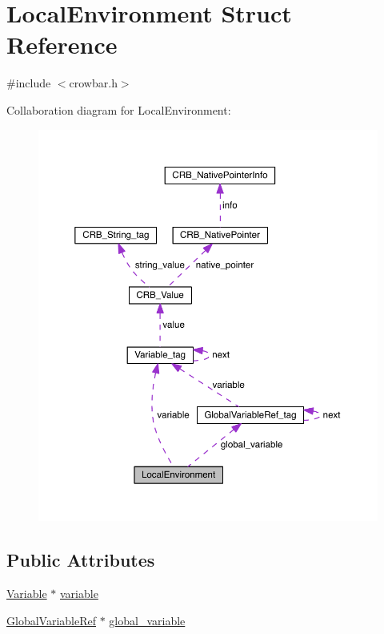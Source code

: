 \hypertarget{struct_local_environment}{}\section{Local\+Environment Struct Reference}
\label{struct_local_environment}


{\ttfamily \#include $<$crowbar.\+h$>$}



Collaboration diagram for Local\+Environment\+:\nopagebreak
\begin{figure}[H]
\begin{center}
\leavevmode
\includegraphics[width=350pt]{struct_local_environment__coll__graph}
\end{center}
\end{figure}
\subsection*{Public Attributes}
\begin{DoxyCompactItemize}
\item 
\hyperlink{crowbar_8h_a070c86ad7ae39536aed471927d04dee4}{Variable} $\ast$ \hyperlink{struct_local_environment_a80c4a3efddd4486c76844fb7f22bca1d}{variable}
\item 
\hyperlink{crowbar_8h_ac709ecd8d021425e844a82940d5d1028}{Global\+Variable\+Ref} $\ast$ \hyperlink{struct_local_environment_a4c244dd2fedac828d3db9e42a61772a1}{global\+\_\+variable}
\end{DoxyCompactItemize}


